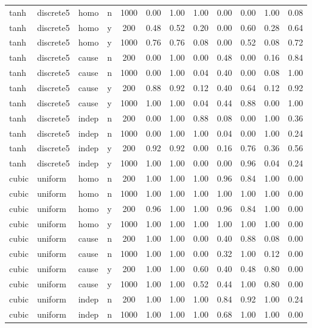 \begin{longtable}{@{}lllccccccccc@{}}
tanh & discrete5 & homo & n & 1000 & 0.00 & 1.00 & 1.00 & 0.00 & 0.00 & 1.00 & 0.08\\
tanh & discrete5 & homo & y & 200 & 0.48 & 0.52 & 0.20 & 0.00 & 0.60 & 0.28 & 0.64\\
tanh & discrete5 & homo & y & 1000 & 0.76 & 0.76 & 0.08 & 0.00 & 0.52 & 0.08 & 0.72\\
tanh & discrete5 & cause & n & 200 & 0.00 & 1.00 & 0.00 & 0.48 & 0.00 & 0.16 & 0.84\\
tanh & discrete5 & cause & n & 1000 & 0.00 & 1.00 & 0.04 & 0.40 & 0.00 & 0.08 & 1.00\\
tanh & discrete5 & cause & y & 200 & 0.88 & 0.92 & 0.12 & 0.40 & 0.64 & 0.12 & 0.92\\
tanh & discrete5 & cause & y & 1000 & 1.00 & 1.00 & 0.04 & 0.44 & 0.88 & 0.00 & 1.00\\
tanh & discrete5 & indep & n & 200 & 0.00 & 1.00 & 0.88 & 0.08 & 0.00 & 1.00 & 0.36\\
tanh & discrete5 & indep & n & 1000 & 0.00 & 1.00 & 1.00 & 0.04 & 0.00 & 1.00 & 0.24\\
tanh & discrete5 & indep & y & 200 & 0.92 & 0.92 & 0.00 & 0.16 & 0.76 & 0.36 & 0.56\\
tanh & discrete5 & indep & y & 1000 & 1.00 & 1.00 & 0.00 & 0.00 & 0.96 & 0.04 & 0.24\\
cubic & uniform & homo & n & 200 & 1.00 & 1.00 & 1.00 & 0.96 & 0.84 & 1.00 & 0.00\\
cubic & uniform & homo & n & 1000 & 1.00 & 1.00 & 1.00 & 1.00 & 1.00 & 1.00 & 0.00\\
cubic & uniform & homo & y & 200 & 0.96 & 1.00 & 1.00 & 0.96 & 0.84 & 1.00 & 0.00\\
cubic & uniform & homo & y & 1000 & 1.00 & 1.00 & 1.00 & 1.00 & 1.00 & 1.00 & 0.00\\
cubic & uniform & cause & n & 200 & 1.00 & 1.00 & 0.00 & 0.40 & 0.88 & 0.08 & 0.00\\
cubic & uniform & cause & n & 1000 & 1.00 & 1.00 & 0.00 & 0.32 & 1.00 & 0.12 & 0.00\\
cubic & uniform & cause & y & 200 & 1.00 & 1.00 & 0.60 & 0.40 & 0.48 & 0.80 & 0.00\\
cubic & uniform & cause & y & 1000 & 1.00 & 1.00 & 0.52 & 0.44 & 1.00 & 0.80 & 0.00\\
cubic & uniform & indep & n & 200 & 1.00 & 1.00 & 1.00 & 0.84 & 0.92 & 1.00 & 0.24\\
cubic & uniform & indep & n & 1000 & 1.00 & 1.00 & 1.00 & 0.68 & 1.00 & 1.00 & 0.00\\

\end{longtable}
